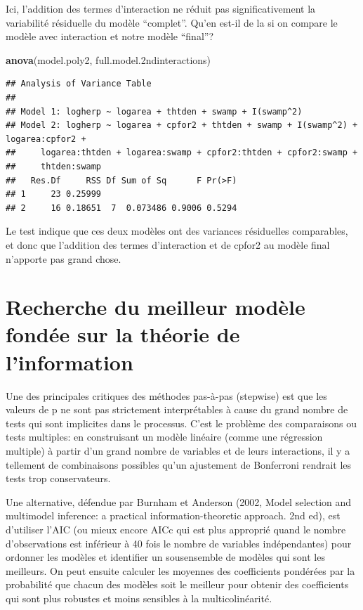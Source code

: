 \documentclass[
  12pt,
]{book}
\newenvironment{Shaded}{\begin{snugshade}}{\end{snugshade}}
\newcommand{\FloatTok}[1]{\textcolor[rgb]{0.00,0.00,0.81}{#1}}
\newcommand{\KeywordTok}[1]{\textcolor[rgb]{0.13,0.29,0.53}{\textbf{#1}}}
\newcommand{\NormalTok}[1]{#1}
\begin{document}
Ici, l'addition des termes d'interaction ne réduit pas significativement la variabilité résiduelle du modèle ``complet''. Qu'en est-il de la si on compare le modèle avec interaction et notre modèle ``final''?

\begin{Shaded}
\begin{Highlighting}[]
\KeywordTok{anova}\NormalTok{(model.poly2, full.model}\FloatTok{.2}\NormalTok{ndinteractions)}
\end{Highlighting}
\end{Shaded}

\begin{verbatim}
## Analysis of Variance Table
## 
## Model 1: logherp ~ logarea + thtden + swamp + I(swamp^2)
## Model 2: logherp ~ logarea + cpfor2 + thtden + swamp + I(swamp^2) + logarea:cpfor2 + 
##     logarea:thtden + logarea:swamp + cpfor2:thtden + cpfor2:swamp + 
##     thtden:swamp
##   Res.Df     RSS Df Sum of Sq      F Pr(>F)
## 1     23 0.25999                           
## 2     16 0.18651  7  0.073486 0.9006 0.5294
\end{verbatim}

Le test indique que ces deux modèles ont des variances résiduelles comparables, et donc que l'addition des termes d'interaction et de cpfor2 au modèle final n'apporte pas grand chose.

\hypertarget{recherche-du-meilleur-moduxe8le-fonduxe9e-sur-la-thuxe9orie-de-linformation}{%
\section{Recherche du meilleur modèle fondée sur la théorie de l'information}\label{recherche-du-meilleur-moduxe8le-fonduxe9e-sur-la-thuxe9orie-de-linformation}}

Une des principales critiques des méthodes pas-à-pas (stepwise) est que les valeurs de p ne sont pas strictement interprétables à cause du grand nombre de tests qui sont implicites dans le processus. C'est le problème des comparaisons ou tests multiples: en construisant un modèle linéaire (comme une régression multiple) à partir d'un grand nombre de variables et de leurs interactions, il y a tellement de combinaisons possibles qu'un ajustement de Bonferroni rendrait les tests trop conservateurs.

Une alternative, défendue par Burnham et Anderson (2002, Model selection and multimodel inference: a practical information-theoretic approach. 2nd ed), est d'utiliser l'AIC (ou mieux encore AICc qui est plus approprié quand le nombre d'observations est inférieur à 40 fois le nombre de variables indépendantes) pour ordonner les modèles et identifier un sousensemble de modèles qui sont les meilleurs. On peut ensuite calculer les moyennes des coefficients pondérées par la probabilité que chacun des modèles soit le meilleur pour obtenir des coefficients qui sont plus robustes et moins sensibles à la multicolinéarité.
\end{document}
